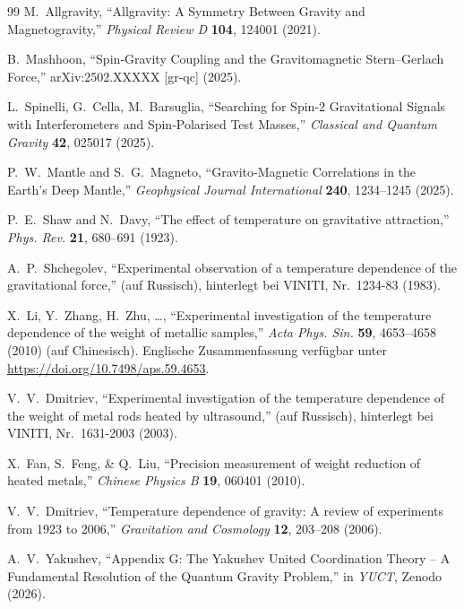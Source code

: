 \documentclass[12pt]{article}
\theoremstyle{remark}
\begin{document}
\begin{thebibliography}{99}
		M.~Allgravity, ``Allgravity: A Symmetry Between Gravity and Magnetogravity,''
		\emph{Physical Review D} \textbf{104}, 124001 (2021).
		
		B.~Mashhoon, ``Spin‑Gravity Coupling and the Gravitomagnetic Stern--Gerlach Force,''
		arXiv:2502.XXXXX [gr-qc] (2025).
		
		L.~Spinelli, G.~Cella, M.~Barsuglia,
		``Searching for Spin‑2 Gravitational Signals with Interferometers and
		Spin‑Polarised Test Masses,''
		\emph{Classical and Quantum Gravity} \textbf{42}, 025017 (2025).
		
		P.~W.~Mantle and S.~G.~Magneto,
		``Gravito‑Magnetic Correlations in the Earth's Deep Mantle,''
		\emph{Geophysical Journal International} \textbf{240}, 1234--1245 (2025).
		
		P.~E.~Shaw and N.~Davy, ``The effect of temperature on gravitative attraction,'' \emph{Phys. Rev.} \textbf{21}, 680–691 (1923).
		
		A.~P.~Shchegolev, ``Experimental observation of a temperature dependence of the gravitational force,'' (auf Russisch), hinterlegt bei VINITI, Nr.~1234-83 (1983).
		
		X.~Li, Y.~Zhang, H.~Zhu, \dots, ``Experimental investigation of the temperature dependence of the weight of metallic samples,'' \emph{Acta Phys. Sin.} \textbf{59}, 4653–4658 (2010) (auf Chinesisch). Englische Zusammenfassung verfügbar unter \url{https://doi.org/10.7498/aps.59.4653}.
		
		V.~V.~Dmitriev, ``Experimental investigation of the temperature dependence of the weight of metal rods heated by ultrasound,'' (auf Russisch), hinterlegt bei VINITI, Nr.~1631-2003 (2003).
		
		X.~Fan, S.~Feng, \& Q.~Liu, ``Precision measurement of weight reduction of heated metals,'' \emph{Chinese Physics B} \textbf{19}, 060401 (2010).
		
		V.~V.~Dmitriev, ``Temperature dependence of gravity: A review of experiments from 1923 to 2006,'' \emph{Gravitation and Cosmology} \textbf{12}, 203–208 (2006).
		
		A.~V.~Yakushev, ``Appendix G: The Yakushev United Coordination Theory -- A
		Fundamental Resolution of the Quantum Gravity Problem,''
		in \emph{YUCT}, Zenodo (2026).
		

\end{thebibliography}
\end{document}
